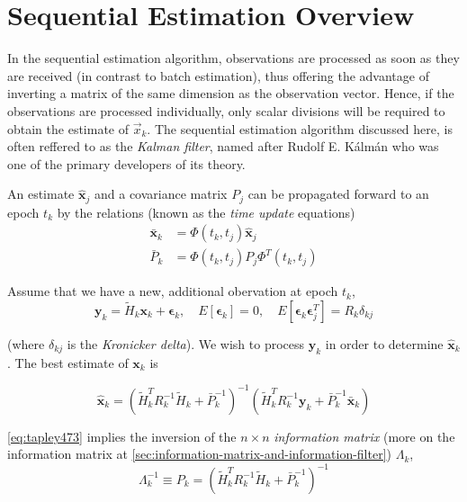 \section{Sequential Estimation Overview}
In the sequential estimation algorithm, observations are processed as soon as they
are received (in contrast to batch estimation), thus offering the advantage of
inverting a matrix of the same dimension as the observation vector. Hence, if the
observations are processed individually, only scalar divisions will be required to
obtain the estimate of \(\vec{x}_k\). The sequential estimation algorithm discussed
here, is often reffered to as the \emph{Kalman filter}, named after Rudolf E. K\'alm\'an
who was one of the primary developers of its theory.

An estimate \(\hat{\bm{x}}_j \) and a covariance matrix \(P_j\) can be
propagated forward to an epoch \(t_k\) by the relations (known as the
\emph{time update} equations)
\begin{subequations}
	\label{eq:tapley471}
	\begin{align}
		\bar{\bm{x}} _k & = \Phi (t_k, t_j) \hat{\bm{x}}_j
		\label{eq:tapley471a} \\
		\bar{P}_k       & = \Phi (t_k, t_j) P_j \Phi ^T (t_k, t_j)
		\label{eq:tapley471b}
	\end{align}
\end{subequations}


Assume that we have a new, additional obervation at epoch \(t_k\),
\begin{equation}
	\bm{y}_k = \tilde{H}_k \bm{x}_k + \bm{\epsilon} _k ,
	\quad E\left[\bm{\epsilon} _k \right] = 0,
	\quad E\left[\bm{\epsilon} _k \bm{\epsilon} ^T_j \right] = R_k \delta _{kj}
\end{equation}

(where \(\delta _{kj}\) is the \emph{Kronicker delta}). We wish to process
\(\bm{y} _k\) in order to determine \(\hat{\bm{x}} _k\). The best estimate of
\(\bm{x} _k\) is

\begin{equation}
	\label{eq:tapley473}
	\hat{\bm{x}} _k = \left( \tilde{H}^T_k R^{-1}_k \tilde{H}_k + \bar{P}^{-1}_k \right)^{-1} \left( \tilde{H}^T_k R^{-1}_k \bm{y}_k + \bar{P}^{-1}_k \bar{\bm{x}}_k \right)
\end{equation}

\ref{eq:tapley473} implies the inversion of the \(n \times n\) \emph{information matrix} 
(more on the information matrix at \ref{sec:information-matrix-and-information-filter}) \(\Lambda _k\),
\begin{equation}
	\label{eq:tapley474}
	\Lambda ^{-1}_k \equiv P_k =
	\left( \tilde{H}^T_k R^{-1}_k \tilde{H}_k + \bar{P}^{-1}_k \right)^{-1}
\end{equation}

